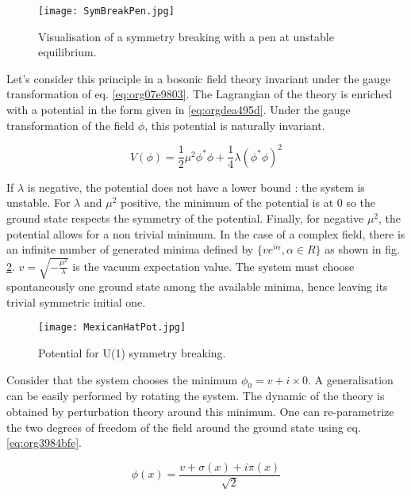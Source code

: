 \begin{figure}[htbp]
\centering
\texttt{[image: SymBreakPen.jpg]}
\caption{\label{fig:orgc07deb6}
Visualisation of a symmetry breaking with a pen at unstable equilibrium. \cite{SymBreakPen}}
\end{figure}

Let's consider this principle in a bosonic field theory invariant under the gauge transformation of eq. \ref{eq:org07e9803}.
The Lagrangian of the theory is enriched with a potential in the form given in \ref{eq:orgdea495d}.
Under the gauge transformation of the field \(\phi\), this potential is naturally invariant.

\begin{equation}
\label{eq:orgdea495d}
V(\phi) = \frac{1}{2}\mu^2\phi^*\phi+\frac{1}{4}\lambda(\phi^*\phi)^2
\end{equation}

If \(\lambda\) is negative, the potential does not have a lower bound : the system is unstable.
For \(\lambda\) and \(\mu^{\text{2}}\) positive, the minimum of the potential is at \(0\) so the ground state respects the symmetry of the potential.
Finally, for negative \(\mu^{\text{2}}\), the potential allows for a non trivial minimum.
In the case of a complex field, there is an infinite number of generated minima defined by \(\{ve^{i\alpha}, \alpha\in R\}\) as shown in fig. \ref{fig:org609c856}.
\(v=\sqrt{-\frac{\mu^2}{\lambda}}\) is the vacuum expectation value.
The system must choose spontaneously one ground state among the available minima, hence leaving its trivial symmetric initial one.


\begin{figure}[htbp]
\centering
\texttt{[image: MexicanHatPot.jpg]}
\caption{\label{fig:org609c856}
Potential for U(1) symmetry breaking. \cite{1DPotential}}
\end{figure}

Consider that the system chooses the minimum \(\phi_0=v+i\times 0\).
A generalisation can be easily performed by rotating the system.
The dynamic of the theory is obtained by perturbation theory around this minimum.
One can re-parametrize the two degrees of freedom of the field around the ground state using eq. \ref{eq:org3984bfe}.

\begin{equation}
\label{eq:org3984bfe}
\phi(x)=\frac{v +\sigma(x)+i\pi(x)}{\sqrt{2}}
\end{equation}

